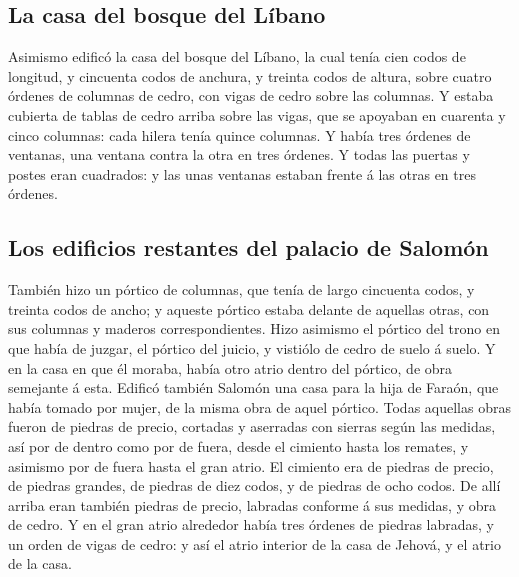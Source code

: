 \hypertarget{la-casa-del-bosque-del-luxedbano}{%
\subsection{La casa del bosque del
Líbano}\label{la-casa-del-bosque-del-luxedbano}}

 Asimismo edificó la casa del bosque del Líbano, la cual
tenía cien codos de longitud, y cincuenta codos de anchura, y treinta
codos de altura, sobre cuatro órdenes de columnas de cedro, con vigas de
cedro sobre las columnas.  Y estaba cubierta de tablas de
cedro arriba sobre las vigas, que se apoyaban en cuarenta y cinco
columnas: cada hilera tenía quince columnas.  Y había tres
órdenes de ventanas, una ventana contra la otra en tres órdenes.
 Y todas las puertas y postes eran cuadrados: y las unas
ventanas estaban frente á las otras en tres órdenes.

\hypertarget{los-edificios-restantes-del-palacio-de-salomuxf3n}{%
\subsection{Los edificios restantes del palacio de
Salomón}\label{los-edificios-restantes-del-palacio-de-salomuxf3n}}

 También hizo un pórtico de columnas, que tenía de largo
cincuenta codos, y treinta codos de ancho; y aqueste pórtico estaba
delante de aquellas otras, con sus columnas y maderos correspondientes.
 Hizo asimismo el pórtico del trono en que había de juzgar,
el pórtico del juicio, y vistiólo de cedro de suelo á suelo.
 Y en la casa en que él moraba, había otro atrio dentro del
pórtico, de obra semejante á esta. Edificó también Salomón una casa para
la hija de Faraón, que había tomado por mujer, de la misma obra de aquel
pórtico.  Todas aquellas obras fueron de piedras de precio,
cortadas y aserradas con sierras según las medidas, así por de dentro
como por de fuera, desde el cimiento hasta los remates, y asimismo por
de fuera hasta el gran atrio.  El cimiento era de piedras
de precio, de piedras grandes, de piedras de diez codos, y de piedras de
ocho codos.  De allí arriba eran también piedras de precio,
labradas conforme á sus medidas, y obra de cedro.  Y en el
gran atrio alrededor había tres órdenes de piedras labradas, y un orden
de vigas de cedro: y así el atrio interior de la casa de Jehová, y el
atrio de la casa.


